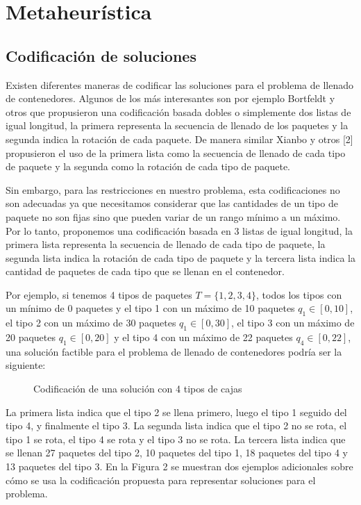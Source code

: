 \section{Metaheurística}

\subsection{Codificación de soluciones}
\label{sec:codificacion}

Existen diferentes maneras de codificar las soluciones para el problema de llenado de contenedores. Algunos de los más interesantes son por ejemplo Bortfeldt y otros \cite{GEHRING1997401} que propusieron una codificación basada dobles o simplemente dos listas de igual longitud, la primera representa la secuencia de llenado de los paquetes y la segunda indica la rotación de cada paquete. De manera similar Xianbo y otros [2] propusieron el uso de la primera lista como la secuencia de llenado de cada tipo de paquete y la segunda como la rotación de cada tipo de paquete.

Sin embargo, para las restricciones en nuestro problema, esta codificaciones no son adecuadas ya que necesitamos considerar que las cantidades de un tipo de paquete no son fijas sino que pueden variar de un rango mínimo a un máximo. Por lo tanto, proponemos una codificación basada en 3 listas de igual longitud, la primera lista representa la secuencia de llenado de cada tipo de paquete, la segunda lista indica la rotación de cada tipo de paquete y la tercera lista indica la cantidad de paquetes de cada tipo que se llenan en el contenedor.


Por ejemplo, si tenemos 4 tipos de paquetes $T=\{1,2,3,4\}$, todos los tipos con un mínimo de 0 paquetes y el tipo 1 con un máximo de 10 paquetes $q_1 \in [0,10]$, el tipo 2 con un máximo de 30 paquetes $q_1 \in [0,30]$, el tipo 3 con un máximo de 20 paquetes $q_1 \in [0,20]$ y el tipo 4 con un máximo de 22 paquetes $q_4 \in [0,22]$, una solución factible para el problema de llenado de contenedores podría ser la siguiente:

\begin{figure}[H]
    \centering
    
    \caption{Codificación de una solución con 4 tipos de cajas}
    \label{fig:codificación}
\end{figure}

La primera lista indica que el tipo 2 se llena primero, luego el tipo 1 seguido del tipo 4, y finalmente el tipo 3. La segunda lista indica que el tipo 2 no se rota, el tipo 1 se rota, el tipo 4 se rota y el tipo 3 no se rota. La tercera lista indica que se llenan 27 paquetes del tipo 2, 10 paquetes del tipo 1, 18 paquetes del tipo 4 y 13 paquetes del tipo 3. En la Figura 2 se muestran dos ejemplos adicionales sobre cómo se usa la codificación propuesta para representar soluciones para el problema.

